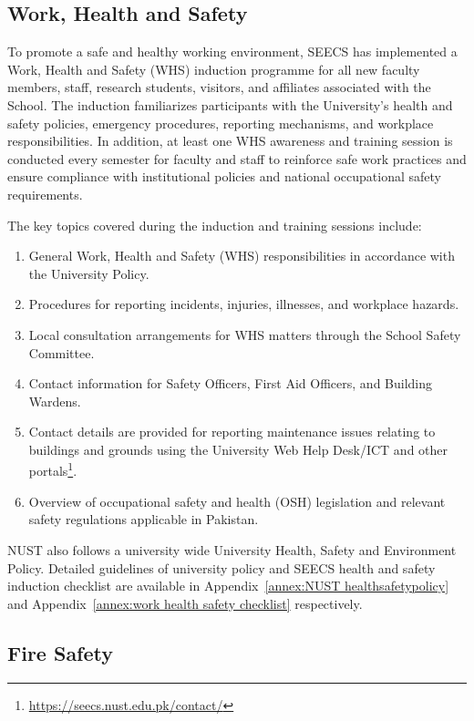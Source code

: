 \subsection{Work, Health and Safety}

To promote a safe and healthy working environment, SEECS has implemented a Work, Health and Safety (WHS) induction programme for all new faculty members, staff, research students, visitors, and affiliates associated with the School. The induction familiarizes participants with the University's health and safety policies, emergency procedures, reporting mechanisms, and workplace responsibilities. In addition, at least one WHS awareness and training session is conducted every semester for faculty and staff to reinforce safe work practices and ensure compliance with institutional policies and national occupational safety requirements.

The key topics covered during the induction and training sessions include:

\begin{enumerate}
  \item General Work, Health and Safety (WHS) responsibilities in accordance with the
        University Policy.
  \item Procedures for reporting incidents, injuries, illnesses, and workplace hazards.
  \item Local consultation arrangements for WHS matters through the School Safety
        Committee.
  \item Contact information for Safety Officers, First Aid Officers, and Building
        Wardens.
  \item Contact details are provided for reporting maintenance issues relating to
        buildings and grounds using the University Web Help Desk/ICT and other
        portals\footnote{\url{https://seecs.nust.edu.pk/contact/}}.
  \item Overview of occupational safety and health (OSH) legislation and relevant
        safety regulations applicable in Pakistan.
\end{enumerate}

NUST also follows a university wide University Health, Safety and Environment Policy. 
Detailed guidelines of university policy and SEECS health and safety induction checklist are available in Appendix~\ref{annex:NUST healthsafetypolicy} and Appendix~\ref{annex:work health safety checklist} respectively.

\hypertarget{fire-safety}{%
\subsection{Fire Safety}\label{fire-safety}}

